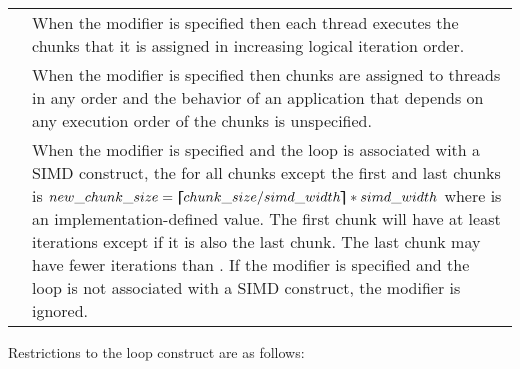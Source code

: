 \pagebreak
\vspace{1ex}\renewcommand{\arraystretch}{1.5}
\tablefirsthead{%
\hline\\[-3ex]
}
\tablelasttail{\hline}
\begin{supertabular}{ p{1in} p{4.1in} }
 & When the  modifier is specified then each thread executes the chunks 
that it is assigned in increasing logical iteration order.\\
 & When the  modifier is specified then chunks are assigned to threads 
in any order and the behavior of an application that depends on any execution order of the chunks is unspecified.\\
 & When the  modifier is specified and the loop is associated with a SIMD construct, the  for all chunks except the first and last chunks  is  $new\_chunk\_size = \bm{\lceil\mkern-10mu\lceil} chunk\_size / simd\_width \bm{\rceil\mkern-10mu\rceil} * simd\_width $ where  is an implementation-defined value. The first chunk will have at least  iterations except if it is also the last chunk. The last chunk may have fewer iterations than . If the  modifier is specified and the loop is not associated  with a SIMD construct, the modifier is ignored.\\
\end{supertabular}

\restrictions
Restrictions to the loop construct are as follows:

